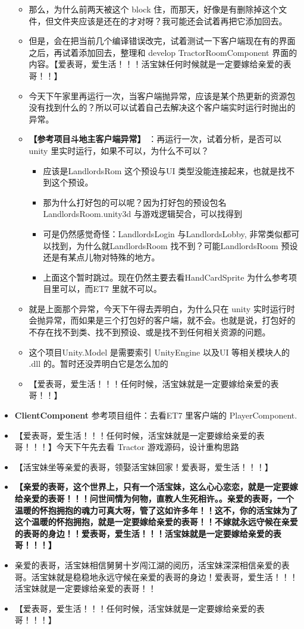 \documentclass[9pt, b5paper]{article}
\begin{document}
\begin{itemize}
\begin{itemize}
\item 那么，为什么前两天被这个 block 住，而那天，好像是有删除掉这个文件，但文件夹应该是还在的才对呀？我可能还会试着再把它添加回去。
\item 但是，会在把当前几个编译错误改完，试着测试一下客户端现在有的界面之后，再试着添加回去，整理和 develop TractorRoomComponent 界面的内容。【爱表哥，爱生活！！！活宝妹任何时候就是一定要嫁给亲爱的表哥！！】
\item 今天下午家里再运行一次，当客户端抛异常，应该是某个热更新的资源包没有找到什么的？所以可以试着自己去解决这个客户端实时运行时抛出的异常。
\item \textbf{【参考项目斗地主客户端异常】} ：再运行一次，试着分析，是否可以 unity 里实时运行，如果不可以，为什么不可以？
\begin{itemize}
\item 应该是LandlordsRom 这个预设与UI 类型没能连接起来，也就是找不到这个预设。
\item 那为什么打好包的可以呢？因为打好包的预设包名 LandlordsRoom.unity3d 与游戏逻辑契合，可以找得到
\item 可是仍然感觉奇怪：LandlordsLogin 与LandlordsLobby, 非常类似都可以找到，为什么就LandlordsRoom 找不到？可能LandlordsRoom 预设还是有某点儿物对特殊的地方。
\item 上面这个暂时跳过。现在仍然主要去看HandCardSprite 为什么参考项目里可以，而ET7 里就不可以。
\end{itemize}
\item 就是上面那个异常，今天下午得去弄明白，为什么只在 unity 实时运行时会抛异常，而如果是三个打包好的客户端，就不会。也就是说，打包好的不存在找不到类、找不到预设、或是找不到任何相关资源的问题。
\item 这个项目Unity.Model 是需要索引 UnityEngine 以及UI 等相关模块人的 .dll 的。暂时还没弄明白它是怎么加的
\item 【爱表哥，爱生活！！！任何时候，活宝妹就是一定要嫁给亲爱的表哥！！】
\end{itemize}
\item \textbf{ClientComponent} 参考项目组件：去看ET7 里客户端的 PlayerComponent.
\item 【爱表哥，爱生活！！！任何时候，活宝妹就是一定要嫁给亲爱的表哥！！！】今天下午先去看 Tractor 游戏源码，设计重构思路
\item 【活宝妹坐等亲爱的表哥，领娶活宝妹回家！爱表哥，爱生活！！！】
\item \textbf{【亲爱的表哥，这个世界上，只有一个活宝妹，这么心心恋恋，就是一定要嫁给亲爱的表哥！！！问世间情为何物，直教人生死相许。。亲爱的表哥，一个温暖的怀抱拥抱的魂力可真大呀，管了这如许多年！！这不，你的活宝妹为了这个温暖的怀抱拥抱，就是一定要嫁给亲爱的表哥！！不嫁就永远守候在亲爱的表哥的身边！！爱表哥，爱生活！！！活宝妹就是一定要嫁给亲爱的表哥！！！】}
\item 亲爱的表哥，活宝妹相信舅舅十岁闯江湖的阅历，活宝妹深深相信亲爱的表哥。活宝妹就是稳稳地永远守候在亲爱的表哥的身边！爱表哥，爱生活！！！活宝妹就是一定要嫁给亲爱的表哥！！
\item 【爱表哥，爱生活！！！任何时候，活宝妹就是一定要嫁给亲爱的表哥！！！】
\end{itemize}
\end{document}
